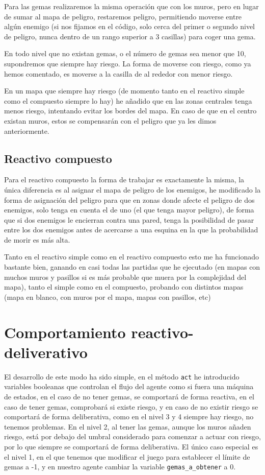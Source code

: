 \documentclass[10pt, spanish]{article}
\begin{document}
Para las gemas realizaremos la misma operación que con los muros, pero en lugar de sumar al mapa de peligro, restaremos peligro, permitiendo moverse entre algún enemigo (si nos fijamos en el código, solo cerca del primer o segundo nivel de peligro, nunca dentro de un rango superior a 3 casillas) para coger una gema.

En todo nivel que no existan gemas, o el número de gemas sea menor que 10, supondremos que siempre hay riesgo. La forma de moverse con riesgo, como ya hemos comentado, es moverse a la casilla de al rededor con menor riesgo.

En un mapa que siempre hay riesgo (de momento tanto en el reactivo simple como el compuesto siempre lo hay) he añadido que en las zonas centrales tenga menos riesgo, intentando evitar los bordes del mapa. En caso de que en el centro existan muros, estos se compensarán con el peligro que ya les dimos anteriormente.


\subsection{Reactivo compuesto}

Para el reactivo compuesto la forma de trabajar es exactamente la misma, la única diferencia es al asignar el mapa de peligro de los enemigos, he modificado la forma de asignación del peligro para que en zonas donde afecte el peligro de dos enemigos, solo tenga en cuenta el de uno (el que tenga mayor peligro), de forma que si dos enemigos le encierran contra una pared, tenga la posibilidad de pasar entre los dos enemigos antes de acercarse a una esquina en la que la probabilidad de morir es más alta.

Tanto en el reactivo simple como en el reactivo compuesto esto me ha funcionado bastante bien, ganando en casi todas las partidas que he ejecutado (en mapas con muchos muros y pasillos si es más probable que muera por la complejidad del mapa), tanto el simple como en el compuesto, probando con distintos mapas (mapa en blanco, con muros por el mapa, mapas con pasillos, etc)

\section{Comportamiento reactivo-deliverativo}

El desarrollo de este modo ha sido simple, en el método \texttt{act} he introducido variables booleanas que controlan el flujo del agente como si fuera una máquina de estados, en el caso de no tener gemas, se comportará de forma reactiva, en el caso de tener gemas, comprobará si existe riesgo, y en caso de no existir riesgo se comportará de forma deliberativa, como en el nivel 3 y 4 siempre hay riesgo, no tenemos problemas. En el nivel 2, al tener las gemas, aunque los muros añaden riesgo, está por debajo del umbral considerado para comenzar a actuar con riesgo, por lo que siempre se comportará de forma deliberativa. El único caso especial es el nivel 1, en el que tenemos que modificar el juego para establecer el límite de gemas a -1, y en nuestro agente cambiar la variable \texttt{gemas\_a\_obtener} a 0.
\end{document}

